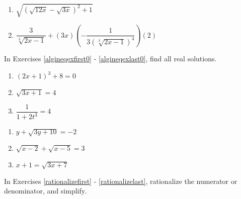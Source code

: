 \documentclass[10pt]{article}
\begin{document}
\begin{multicols}{2}
\begin{enumerate}
\setcounter{enumi}{\value{HW}}

\item  $\sqrt{(\sqrt{12x} - \sqrt{3x})^2+1}$

\item  $\dfrac{3}{\sqrt[3]{2x-1}} + (3x)\left(-\dfrac{1}{3 \left(\sqrt[3]{2x-1} \right)^4}\right)(2)$  \label{simpradlast}

\setcounter{HW}{\value{enumi}}
\end{enumerate}
\end{multicols}



In Exercises \ref{algineqexfirst0} - \ref{algineqexlast0}, find all real solutions.

\begin{multicols}{3}
\begin{enumerate}
\setcounter{enumi}{\value{HW}}

\item  $(2x+1)^3 + 8 = 0$ \label{algineqexfirst0} 
\item $\sqrt{3x+1} = 4$ 
\item  $\dfrac{1}{1 + 2t^3} = 4$ 


\setcounter{HW}{\value{enumi}}
\end{enumerate}
\end{multicols}

\begin{multicols}{3}
\begin{enumerate}
\setcounter{enumi}{\value{HW}}

\item  $y + \sqrt{3y+10} = -2$
\item $\sqrt{x - 2} + \sqrt{x - 5} = 3$
\item $x+1 = \sqrt{3x+7}$ \label{algineqexlast0}%

\setcounter{HW}{\value{enumi}}
\end{enumerate}
\end{multicols}




In Exercises \ref{rationalizefirst} - \ref{rationalizelast}, rationalize the numerator or denominator, and simplify.
\end{document}

